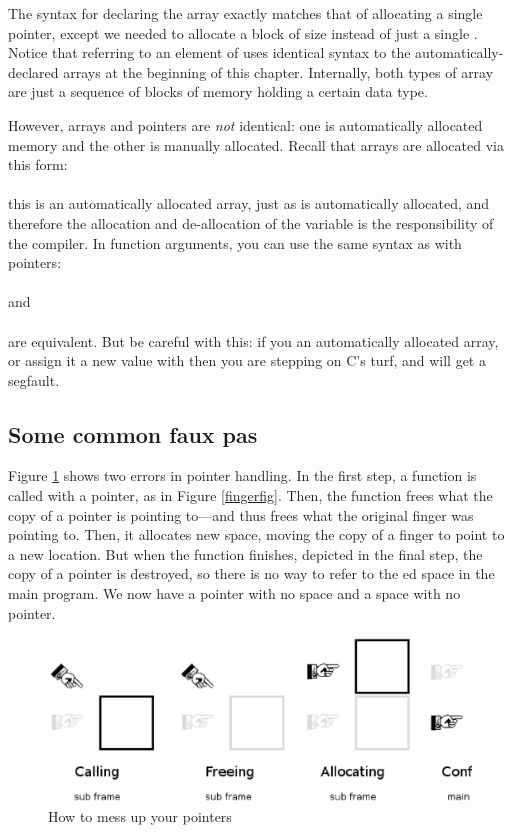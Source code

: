 The syntax for declaring the array exactly match\-es that of allocating
a single pointer, except we need\-ed to allocate a block of size 
 instead of just a single . 
Notice that referring to an element of  uses identical syntax to the 
automatically-declared arrays at the beginning of this chapter.
Internally, both types of array are just a sequence of blocks of memory holding a certain
data type. 

However, arrays and pointers are {\em not} identical: one is
automatically allocated memory and the other is manually allocated.
Recall that arrays are allocated via this form:\\
\\
this is an automatically allocated array, just
as  is automatically allocated, and therefore
the allocation and de-allocation of the variable is the responsibility
of the compiler.  In function arguments, you can use the same
syntax as with pointers: 
\\ \\
and
\\ \\
are equivalent.
But be careful with this: if you  an automatically allocated
array, or assign it a new value with  then you are stepping
on C's turf, and will get a segfault.

\subsection{Some common faux pas} 
Figure \ref{fauxpas} shows two errors in pointer handling. In the first
step, a function is called with a pointer, as in Figure
\ref{fingerfig}. Then, the function frees what the copy of a pointer
is pointing to---and thus frees what the original finger was pointing
to. Then, it allocates new space, moving the copy of a finger to point to
a new location. But when the function finishes, depicted in the final
step, the copy of a pointer is destroyed, so there is no way to refer to
the ed space in the main program. We now have a pointer
with no space and a space with no pointer.

\begin{figure}
\hskip -1cm
\includegraphics[width=\textwidth*\real{1.1}]{pointer_faux_pas.ps}
\caption{How to mess up your pointers}
\label{fauxpas}
\end{figure}


